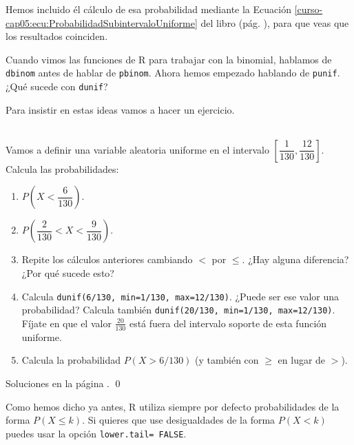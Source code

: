 \documentclass[10pt,a4paper]{article}\usepackage[]{graphicx}\usepackage[]{color}
\newcounter{cont01}
\begin{document}
Hemos incluido él cálculo de esa probabilidad mediante la Ecuación \ref{curso-cap05:ecu:ProbabilidadSubintervaloUniforme} del libro (pág. \pageref{curso-cap05:ecu:ProbabilidadSubintervaloUniforme}), para que veas que los resultados coinciden.

Cuando vimos las funciones de R para trabajar con la binomial, hablamos de {\tt dbinom} antes de hablar de {\tt pbinom}. Ahora hemos empezado hablando de {\tt punif}. ¿Qué sucede con {\tt dunif}?

    \begin{center}
    \end{center}

Para insistir en estas ideas vamos a hacer un ejercicio.
\begin{ejercicio}
\label{tut05:ejercicio17}
\quad\\
Vamos a definir una variable aleatoria uniforme en el intervalo $\left[\dfrac{1}{130}, \dfrac{12}{130}\right]$. Calcula las probabilidades:
\begin{enumerate}
  \item $P\left(X < \dfrac{6}{130}\right)$.
  \item $P\left(\dfrac{2}{130} < X < \dfrac{9}{130}\right)$.
  \item Repite los cálculos anteriores cambiando $<$ por $\leq$. ¿Hay alguna diferencia? ¿Por qué sucede esto?
  \item Calcula {\tt dunif(6/130, min=1/130, max=12/130)}. ¿Puede ser ese valor una probabilidad? Calcula también {\tt dunif(20/130, min=1/130, max=12/130)}. Fíjate en que el valor $\frac{20}{130}$ está fuera del intervalo soporte de esta función uniforme.
  \item Calcula la probabilidad $P(X > 6/130)$ (y también con $\geq$ en lugar de $>$).
\end{enumerate}
Soluciones en la página \pageref{tut05:ejercicio17:sol}.
\qed
\end{ejercicio}
Como hemos dicho ya antes, R utiliza siempre por defecto probabilidades de la forma $P(X \leq k)$. Si quieres que use desigualdades de la forma $P(X < k)$ puedes usar la opción {\tt lower.tail= FALSE}.
\end{document}
